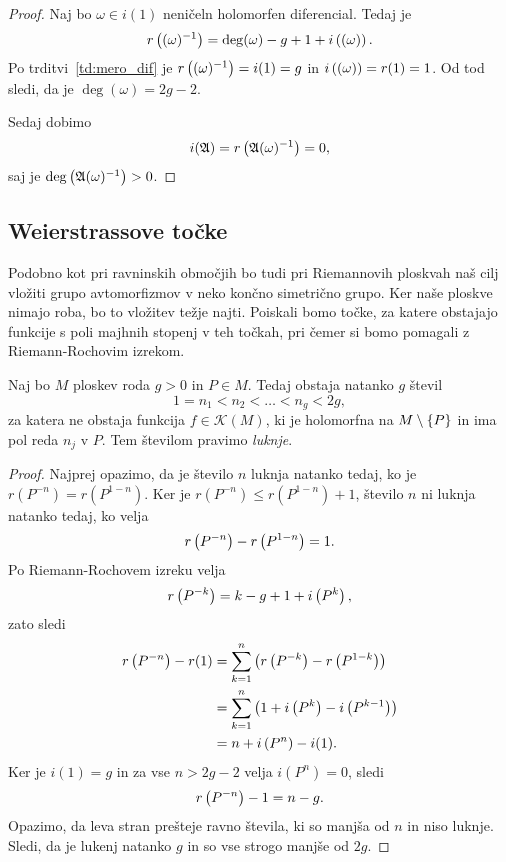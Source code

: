 \begin{proof}
Naj bo $\omega \in i(1)$ neničeln holomorfen diferencial. Tedaj je
\[
r \left((\omega)^{-1}\right) = \deg (\omega) - g + 1 + i \left((\omega)\right).
\]
Po trditvi~\ref{td:mero_dif} je $r \left((\omega)^{-1}\right) = i(1) = g$
in $i \left((\omega)\right) = r(1) = 1$. Od tod sledi, da je
$\deg (\omega) = 2g - 2$.

Sedaj dobimo
\[
i(\mathfrak{A}) = r \left(\mathfrak{A} (\omega)^{-1}\right) = 0,
\]
saj je $\deg \left(\mathfrak{A} (\omega)^{-1}\right) > 0$.
\end{proof}

\subsection{Weierstrassove točke}

Podobno kot pri ravninskih območjih bo tudi pri Riemannovih
ploskvah naš cilj vložiti grupo avtomorfizmov v neko končno
simetrično grupo. Ker naše ploskve nimajo roba, bo to vložitev
težje najti. Poiskali bomo točke, za katere obstajajo funkcije s
poli majhnih stopenj v teh točkah, pri čemer si bomo pomagali z
Riemann-Rochovim izrekom.

\begin{izrek}[Weierstrass]
Naj bo $M$ ploskev roda $g > 0$ in $P \in M$. Tedaj obstaja
natanko $g$ števil
\[
1 = n_1 < n_2 < \dots < n_g < 2g,
\]
za katera ne obstaja funkcija $f \in \mathscr{K}(M)$, ki je
holomorfna na $M \setminus \left\{P\right\}$ in ima pol reda $n_j$ v $P$.
Tem številom pravimo \emph{luknje}.
\end{izrek}

\begin{proof}
Najprej opazimo, da je število $n$ luknja natanko tedaj, ko je
$r(P^{-n}) = r(P^{1-n})$. Ker je $r(P^{-n}) \leq r(P^{1-n}) + 1$,
število $n$ ni luknja natanko tedaj, ko velja
\[
r \left(P^{-n}\right) - r \left(P^{1-n}\right) = 1.
\]
Po Riemann-Rochovem izreku velja
\[
r \left(P^{-k}\right) = k-g+1 + i \left(P^k\right),
\]
zato sledi
\begin{align*}
r \left(P^{-n}\right) - r(1) &=
\sum_{k=1}^n \left(r \left(P^{-k}\right) - r \left(P^{1-k}\right)\right)
\\
&=
\sum_{k=1}^n \left(1 + i \left(P^k\right) - i \left(P^{k-1}\right)\right)
\\
&=
n + i \left(P^n\right) - i(1).
\end{align*}
Ker je $i(1) = g$ in za vse $n > 2g-2$ velja $i(P^n) = 0$, sledi
\[
r \left(P^{-n}\right) - 1 = n - g.
\]
Opazimo, da leva stran prešteje ravno števila, ki so manjša od $n$
in niso luknje. Sledi, da je lukenj natanko $g$ in so vse strogo
manjše od $2g$.
\end{proof}

